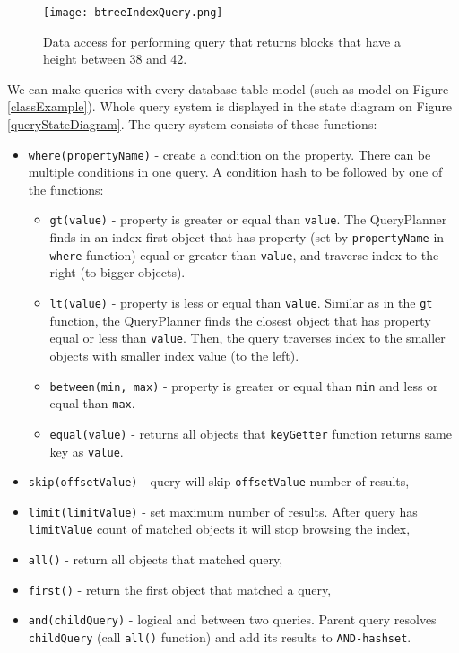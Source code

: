 \begin{figure}[h]
    \centering
    \texttt{[image: btreeIndexQuery.png]}
    \caption{Data access for performing query that returns blocks that have a height between 38 and 42.}
    \label{btreeQuery}
\end{figure}


We can make queries with every database table model (such as model on Figure \ref{classExample}). Whole query system is displayed in the state diagram on Figure \ref{queryStateDiagram}. The query system consists of these functions: 
\begin{itemize}
    \item \texttt{where(propertyName)} - create a condition on the property. There can be multiple conditions in one query. A condition hash to be followed by one of the functions: 
    \begin{itemize}
        \item \texttt{gt(value)} - property is greater or equal than \texttt{value}. The QueryPlanner finds in an index first object that has property (set by \texttt{propertyName} in \texttt{where} function) equal or greater than \texttt{value}, and traverse index to the right (to bigger objects).
        \item \texttt{lt(value)} - property is less or equal than \texttt{value}. Similar as in the \texttt{gt} function, the QueryPlanner finds the closest object that has property equal or less than \texttt{value}. Then, the query traverses index to the smaller objects with smaller index value (to the left).
        \item \texttt{between(min, max)} - property is greater or equal than \texttt{min} and less or equal than \texttt{max}. 
        \item \texttt{equal(value)} - returns all objects that \texttt{keyGetter} function returns same key as \texttt{value}. 
    \end{itemize}
    \item \texttt{skip(offsetValue)} - query will skip \texttt{offsetValue} number of results,
    \item \texttt{limit(limitValue)} - set maximum number of results. After query has \texttt{limitValue} count of matched objects it will stop browsing the index,
    \item \texttt{all()} - return all objects that matched query,
    \item \texttt{first()} - return the first object that matched a query,
    \item \texttt{and(childQuery)} - logical and between two queries. Parent query resolves \texttt{childQuery} (call \texttt{all()} function) and add its results to \texttt{AND-hashset}.

\end{itemize}
